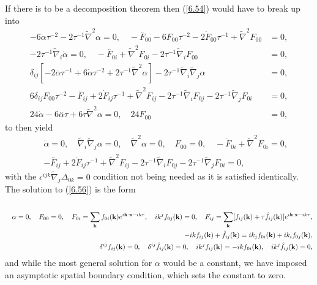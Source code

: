 \documentclass[aps,onecolumn,10pt]{revtex4}
\numberwithin{equation}{section}
\numberwithin{equation}{section}
\begin{document}
If there is to be a decomposition theorem then (\ref{6.54}) would have to break up into 
%
\begin{align}
 -6 \dot{\alpha} \tau^{-2} - 2 \tau^{-1} \tilde{\nabla}^2\alpha=0, \quad - \overset{..}{F}_{00}  - 6 F_{00} \tau^{-2} - 2 \dot{F}_{00} \tau^{-1} + \tilde{\nabla}^2F_{00}&=0,
\nonumber\\ 
 -2 \tau^{-1} \tilde{\nabla}_{i}\dot{\alpha}=0,\quad - \overset{..}{F}_{0i} +  \tilde{\nabla}^2F_{0i} - 2 \tau^{-1} \tilde{\nabla}_{i}F_{00}&=0,
\nonumber\\ 
\delta_{ij} \left[- 2 \ddot{\alpha}\tau^{-1}+  6 \dot{\alpha} \tau^{-2}  + 2\tau^{-1} \tilde{\nabla}^2\alpha \right]-2\tau^{-1} \tilde{\nabla}_{i}\tilde{\nabla}_{j}\alpha&=0,
\nonumber\\
6 \delta_{ij}F_{00} \tau^{-2} - \overset{..}{F}_{ij}  + 2 \dot{F}_{ij} \tau^{-1} + \tilde{\nabla}^2F_{ij} - 2 \tau^{-1} \tilde{\nabla}_{i}F_{0j} - 2 \tau^{-1} \tilde{\nabla}_{j}F_{0i}&=0,
\nonumber\\
24\dot{\alpha} - 6  \overset{..}{\alpha} \tau + 6  \tau \tilde{\nabla}^2\alpha=0,\quad 24 F_{00}&=0,
\label{6.55}
\end{align}
%
to then yield
%
\begin{eqnarray}
&& \dot{\alpha}=0,\quad \tilde{\nabla}_{i}\tilde{\nabla}_{j}\alpha=0,\quad \tilde{\nabla}^2\alpha=0,\quad F_{00}=0,\quad  - \ddot{F}_{0i} +  \tilde{\nabla}^2F_{0i} =0,
\nonumber\\ 
&&  - \overset{..}{F}_{ij}  + 2 \dot{F}_{ij} \tau^{-1} + \tilde{\nabla}^2F_{ij} - 2 \tau^{-1} \tilde{\nabla}_{i}F_{0j} - 2 \tau^{-1} \tilde{\nabla}_{j}F_{0i}=0,
\label{6.56}
\end{eqnarray}
%
with the $\epsilon^{ijk}\tilde{\nabla}_j\Delta_{0k}=0$ condition not being needed as it is satisfied identically. The solution to (\ref{6.56}) is the form 
%
\begin{eqnarray}
\nonumber\\ 
&& \alpha=0,\quad F_{00}=0,\quad F_{0i}=\sum _{\bf k}f_{0i}({\bf k})e^{i{\bf k}\cdot {\bf x}-ik\tau},\quad  ik^jf_{0j}({\bf k})=0,\quad F_{ij}=\sum _{\bf k}[f_{ij}({\bf k})+\tau\hat{f}_{ij}({\bf k})]e^{i{\bf k}\cdot {\bf x}-ik\tau},
\nonumber\\
&&-ikf_{ij}({\bf k})+\hat{f}_{ij}({\bf k})=ik_jf_{0i}({\bf k})+ik_if_{0j}({\bf k}),
\nonumber\\
&&\delta^{ij}f_{ij}({\bf k})=0,\quad
\delta^{ij}\hat{f}_{ij}({\bf k})=0,\quad ik^jf_{ij}({\bf k})=-ikf_{0i}({\bf k}),\quad ik^j\hat{f}_{ij}({\bf k})=0,
\label{6.57}
\end{eqnarray}
%
and while the most general solution for  $\alpha$ would be  a constant,  we have imposed an asymptotic spatial boundary condition, which sets the constant to zero.
\end{document}

